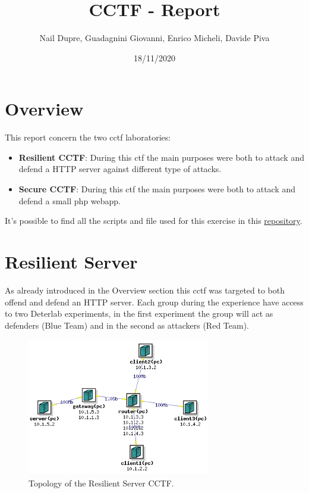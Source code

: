 \documentclass[14pt]{article}
\title{CCTF - Report}
\date{18/11/2020}
\author{Nail Dupre, Guadagnini Giovanni, Enrico Micheli, Davide Piva}
\begin{document}
	
\maketitle
	
\tableofcontents
\newpage
\section{Overview}
This report concern the two cctf laboratories:
\begin{itemize}
	\item \textbf{Resilient CCTF}: During this ctf the main purposes were both to attack and defend a HTTP server against different type of attacks.
	\item \textbf{Secure CCTF}: During this ctf the main purposes were both to attack and defend a small php webapp.
\end{itemize}

It's possible to find all the scripts and file used for this exercise in this \href{https://github.com/giovanniguadagnini/cctf-group5}{repository}.

\section{Resilient Server}
As already introduced in the Overview section this cctf was targeted to both offend and defend an HTTP server. Each group during the experience have access to two Deterlab experiments, in the first experiment the group will act as defenders (Blue Team) and in the second as attackers (Red Team).

\label{sec:TopologyExaplanation}
\begin{figure}[!h]
	\centering
	\includegraphics[width=8cm,height=6cm]{ResilientServerTopology}
	\caption{Topology of the Resilient Server CCTF.}
\end{figure}
\end{document}
